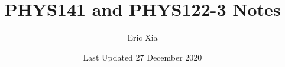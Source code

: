 \documentclass{article}
\title{PHYS141 and PHYS122-3 Notes}
\author{Eric Xia}
\date{Last Updated 27 December 2020}
\begin{document}
    \maketitle
    \tableofcontents
    \pagebreak



    
    
    
    
    
    
    
    
    
    
    
    
    
    
    
    
    
    
    
    
\end{document}
